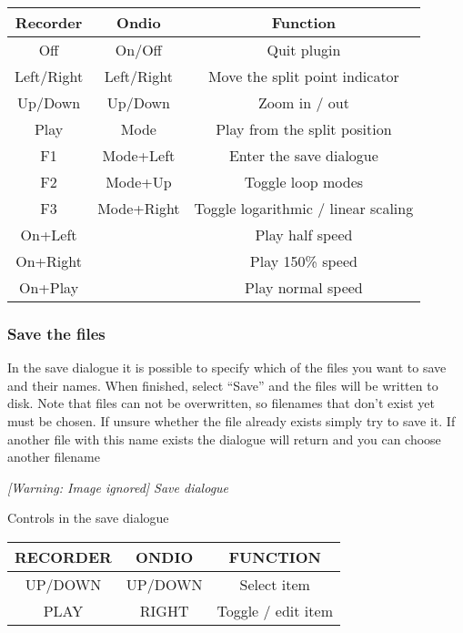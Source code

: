 \begin{table}[h!]
\begin{tabular}{|c|c|c|}
\hline
Recorder & Ondio & Function \\\hline
Off & On/Off & Quit plugin \\\hline
Left/Right & Left/Right & Move the split point indicator \\\hline
Up/Down & Up/Down & Zoom in / out \\\hline
Play & Mode & Play from the split position \\\hline
F1 & Mode+Left & Enter the save dialogue \\\hline
F2 & Mode+Up & Toggle loop modes \\\hline
F3 & Mode+Right & Toggle logarithmic / linear scaling \\\hline
On+Left & ~ & Play half speed \\\hline
On+Right & ~ & Play 150\% speed \\\hline
On+Play & ~ & Play normal speed \\\hline
\end{tabular}
\end{table}

\subsubsection{Save the files}
In the save dialogue it is possible to specify which of the files you
want to save and their names.  When finished, select
``Save'' and the files will be written to
disk. Note that files can not be overwritten, so filenames that
don't exist yet must be chosen. If unsure whether the
file already exists simply try to save it. If another file with this
name exists the dialogue will return and you can choose another
filename

{\centering\itshape
  [Warning: Image ignored] %
 \newline
Save dialogue
\par}

Controls in the save dialogue
\begin{table}[h!]
\begin{tabular}{|c|c|c|}
\hline
RECORDER & ONDIO & FUNCTION \\\hline
UP/DOWN & UP/DOWN & Select item \\\hline
PLAY & RIGHT & Toggle / edit item \\\hline
\end{tabular}
\end{table}

